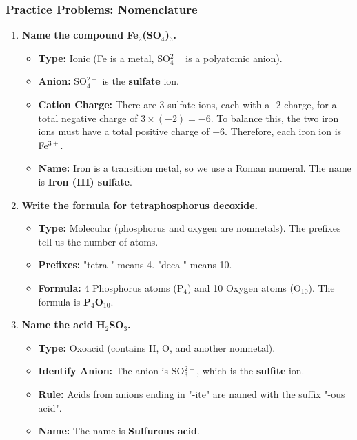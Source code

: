 \documentclass{article}
\begin{document}
\subsubsection*{Practice Problems: Nomenclature}
\begin{enumerate}[itemsep=5pt]
    \item \textbf{Name the compound Fe\(_2\)(SO\(_4\))\(_3\).}
    \begin{itemize}
        \item \textbf{Type:} Ionic (Fe is a metal, SO\(_4^{2-}\) is a polyatomic anion).
        \item \textbf{Anion:} SO\(_4^{2-}\) is the \textbf{sulfate} ion.
        \item \textbf{Cation Charge:} There are 3 sulfate ions, each with a -2 charge, for a total negative charge of \(3 \times (-2) = -6\). To balance this, the two iron ions must have a total positive charge of +6. Therefore, each iron ion is Fe\(^{3+}\).
        \item \textbf{Name:} Iron is a transition metal, so we use a Roman numeral. The name is \textbf{Iron (III) sulfate}.
    \end{itemize}
    \item \textbf{Write the formula for tetraphosphorus decoxide.}
    \begin{itemize}
        \item \textbf{Type:} Molecular (phosphorus and oxygen are nonmetals). The prefixes tell us the number of atoms.
        \item \textbf{Prefixes:} "tetra-" means 4. "deca-" means 10.
        \item \textbf{Formula:} 4 Phosphorus atoms (P\(_4\)) and 10 Oxygen atoms (O\(_{10}\)). The formula is \textbf{P\(_4\)O\(_{10}\)}.
    \end{itemize}
    \item \textbf{Name the acid H\(_2\)SO\(_3\).}
    \begin{itemize}
        \item \textbf{Type:} Oxoacid (contains H, O, and another nonmetal).
        \item \textbf{Identify Anion:} The anion is SO\(_3^{2-}\), which is the \textbf{sulfite} ion.
        \item \textbf{Rule:} Acids from anions ending in "-ite" are named with the suffix "-ous acid".
        \item \textbf{Name:} The name is \textbf{Sulfurous acid}.
    \end{itemize}
\end{enumerate}
\end{document}
